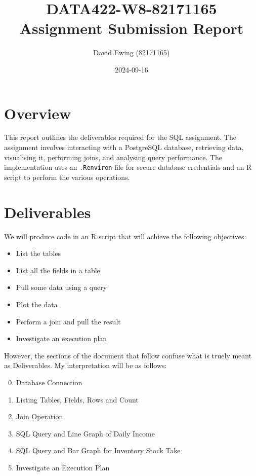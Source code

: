 \documentclass[a4paper,11pt]{extarticle}
\title{DATA422-W8-82171165 \\Assignment Submission Report}
\author{David Ewing (82171165)}
\date{2024-09-16}
\begin{document}
\maketitle

\section*{Overview}
This report outlines the deliverables required for the SQL assignment. The assignment involves interacting with a PostgreSQL database, retrieving data, visualising it, performing joins, and analysing query performance. The implementation uses an \texttt{.Renviron} file for secure database credentials and an R script to perform the various operations.

\section*{Deliverables}
We will produce code in an R script that will achieve the following objectives:
\begin{itemize}
    \item List the tables
    \item List all the fields in a table
    \item Pull some data using a query
    \item Plot the data
    \item Perform a join and pull the result
    \item Investigate an execution plan

\end{itemize}


\noindent However, the sections of the document that follow confuse what is truely meant as Deliverables. My interpretation will be as follows:
\begin{enumerate}
  \setcounter{enumi}{-1}  %
  \item Database Connection
  \item Listing Tables, Fields, Rows and Count
  \item Join Operation
  \item SQL Query and Line Graph of Daily Income
  \item SQL Query and Bar Graph for Inventory Stock Take
  \item Investigate an Execution Plan
\end{enumerate}

\newpage
\end{document}
